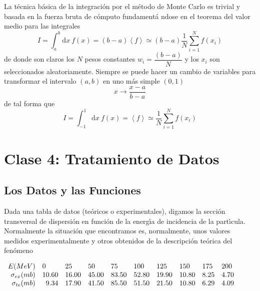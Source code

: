 \documentclass[spanish,titlepage,11pt]{article}
\begin{document}
La t\'{e}cnica b\'{a}sica de la integraci\'{o}n por el m\'{e}todo de Monte
Carlo es trivial y basada en la fuerza bruta de c\'{o}mputo fundament\'{a}%
ndose en el teorema del valor medio para las integrales
\begin{equation}
I=\int_{a}^{b}\mathrm{d}x\ f(x)=\left(  b-a\right)  \left\langle
f\right\rangle \simeq\left(  b-a\right)  \dfrac{1}{N}\sum_{i=1}^{N}f(x_{i})
\end{equation}
de donde son claros los $N$ pesos constantes $w_{i}=\dfrac{\left(  b-a\right)
}{N}$ y los $x_{i}$ son seleccionados aleatoriamente. Siempre se puede hacer
un cambio de variables para transformar el intervalo $\left(  a,b\right)  $ en
uno m\'{a}s simple $\left(  0,1\right)  $%
\begin{equation}
x\longrightarrow\dfrac{x-a}{b-a}%
\end{equation}
de tal forma que
\begin{equation}
I=\int_{-1}^{1}\mathrm{d}x\ f(x)=\left\langle f\right\rangle \simeq\dfrac
{1}{N}\sum_{i=1}^{N}f(x_{i})
\end{equation}

\newpage\newpage

\section{\textbf{Clase 4: Tratamiento de Datos}}

\subsection{Los Datos y las Funciones}

Dada una tabla de datos (te\'{o}ricos o experimentales), digamos la
secci\'{o}n transversal de dispersi\'{o}n en funci\'{o}n de la energ\'{\i}a de
incidencia de la part\'{\i}cula. Normalmente la situaci\'{o}n que encontramos
es, normalmente, unos valores medidos experimentalmente y otros obtenidos de
la descripci\'{o}n te\'{o}rica del fen\'{o}meno

\begin{center}
$%
\begin{array}
[c]{llllllllll}%
E(MeV) & 0 & 25 & 50 & 75 & 100 & 125 & 150 & 175 & 200\\
\multicolumn{1}{r}{\sigma_{ex}(mb)} & \multicolumn{1}{r}{10.60} &
\multicolumn{1}{r}{16.00} & \multicolumn{1}{r}{45.00} &
\multicolumn{1}{r}{83.50} & \multicolumn{1}{r}{52.80} &
\multicolumn{1}{r}{19.90} & \multicolumn{1}{r}{10.80} &
\multicolumn{1}{r}{8.25} & \multicolumn{1}{r}{4.70}\\
\multicolumn{1}{r}{\sigma_{te}(mb)} & \multicolumn{1}{r}{9.34} &
\multicolumn{1}{r}{17.90} & \multicolumn{1}{r}{41.50} &
\multicolumn{1}{r}{85.50} & \multicolumn{1}{r}{51.50} &
\multicolumn{1}{r}{21.50} & \multicolumn{1}{r}{10.80} &
\multicolumn{1}{r}{6.29} & \multicolumn{1}{r}{4.09}%
\end{array}
$
\end{center}
\end{document}
